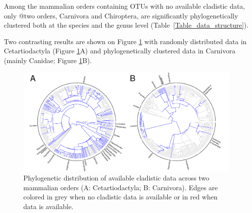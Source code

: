 \documentclass[12pt,letterpaper]{article}
\begin{document}
\begin{center}

\end{center}

%

Among the mammalian orders containing OTUs with no available cladistic data, only @two orders, Carnivora and Chiroptera, are significantly phylogenetically clustered both at the species and the genus level (Table~\ref{Table_data_structure}).

%

Two contrasting results are shown on Figure \ref{Figure_example_coverage} with randomly distributed data in Cetartiodactyla (Figure \ref{Figure_example_coverage}A) and phylogenetically clustered data in Carnivora (mainly Canidae; Figure \ref{Figure_example_coverage}B).

\begin{figure}[!htbp]
\centering
    \includegraphics[width=1\textwidth]{example_coverage.pdf}
\caption{Phylogenetic distribution of available cladistic data across two mammalian orders (A: Cetartiodactyla; B: Carnivora).
Edges are colored in grey when no cladistic data is available or in red when data is available.}
\label{Figure_example_coverage}
\end{figure}
\end{document}
